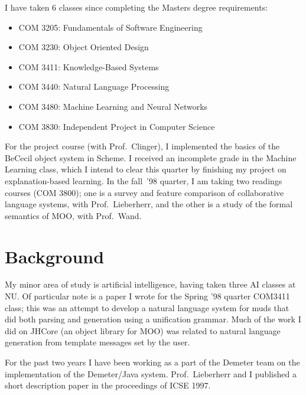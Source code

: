 \documentclass{article}
\begin{document}
I have taken 6 classes since completing the Masters degree
requirements:
\begin{itemize}
    \item COM 3205: Fundamentals of Software Engineering
    \item COM 3230: Object Oriented Design
    \item COM 3411: Knowledge-Based Systems
    \item COM 3440: Natural Language Processing
    \item COM 3480: Machine Learning and Neural Networks
    \item COM 3830: Independent Project in Computer Science
\end{itemize}
For the project course (with Prof.~Clinger), I implemented the basics
of the BeCecil object system\cite{BeCecil} in Scheme.  I received an
incomplete grade in the Machine Learning class, which I intend to
clear this quarter by finishing my project on explanation-based
learning.  In the fall~'98 quarter, I am taking two readings courses
(COM 3800); one is a survey and feature comparison of collaborative
language systems, with Prof.~Lieberherr, and the other is a study of
the formal semantics of MOO, with Prof.~Wand.

\section{Background}

My minor area of study is artificial intelligence, having taken three
AI classes at NU\@.  Of particular note is a paper I wrote for the
Spring '98 quarter COM3411 class\cite{NL-VR}; this was an attempt to
develop a natural language system for muds that did both parsing and
generation using a unification grammar.  Much of the work I did on
JHCore (an object library for MOO) was related to natural language
generation from template messages set by the user.

For the past two years I have been working as a part of the Demeter
team on the implementation of the Demeter/Java
system\cite{UserManual}.  Prof.~Lieberherr and I published a short
description paper in the proceedings of ICSE
1997\cite{preventive-maintenance}.



\end{document}
